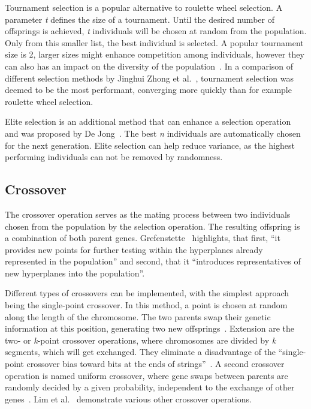 Tournament selection is a popular alternative to roulette wheel selection. A parameter \textit{t} defines the size of a tournament. Until the desired number of offsprings is achieved, \textit{t} individuals will be chosen at random from the population. Only from this smaller list, the best individual is selected. A popular tournament size is 2, larger sizes might enhance competition among individuals, however they can also has an impact on the diversity of the population~\cite{hussain_trade-off_2020}. In a comparison of different selection methods by Jinghui Zhong et al.~\cite{jinghui_zhong_comparison_2005}, tournament selection was deemed to be the most performant, converging more quickly than for example roulette wheel selection.

Elite selection is an additional method that can enhance a selection operation and was proposed by De Jong~\cite{de_jong_analysis_1975}. The best \textit{n} individuals are automatically chosen for the next generation. Elite selection can help reduce variance, as the highest performing individuals can not be removed by randomness.

\subsection{Crossover}
The crossover operation serves as the mating process between two individuals chosen from the population by the selection operation. The resulting offspring is a combination of both parent genes. Grefenstette~\cite{grefenstette_optimization_1986} highlights, that first, \enquote{it provides new points for further testing within the hyperplanes already represented in the population} and second, that it \enquote{introduces representatives of new hyperplanes into the population}. 

Different types of crossovers can be implemented, with the simplest approach being the single-point crossover. In this method, a point is chosen at random along the length of the chromosome. The two parents swap their genetic information at this position, generating two new offsprings~\cite{katoch_review_2021}. Extension are the two- or \textit{k}-point crossover operations, where chromosomes are divided by \textit{k} segments, which will get exchanged. They eliminate a disadvantage of the \enquote{single-point crossover bias toward bits at the ends of strings}~\cite{srinivas_genetic_1994}. A second crossover operation is named uniform crossover, where gene swaps between parents are randomly decided by a given probability, independent to the exchange of other genes~\cite{katoch_review_2021}. Lim et al.~\cite{lim_crossover_2017} demonstrate various other crossover operations.

